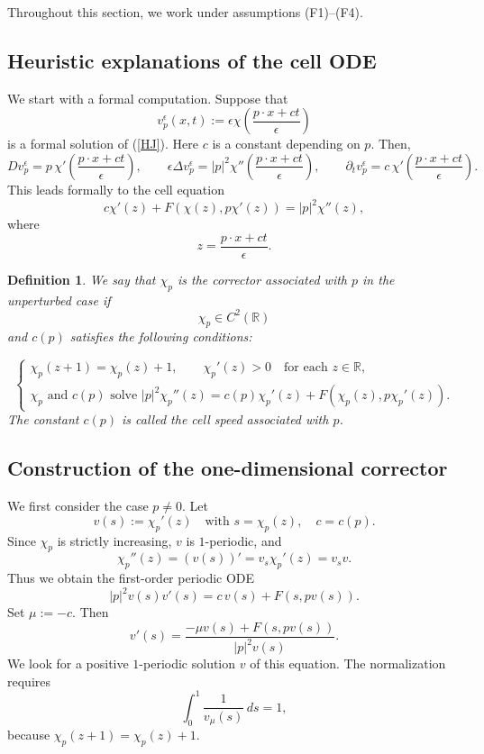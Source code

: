 \documentclass[preprint]{elsarticle}
\newtheorem{definition}{Definition}[section]
\numberwithin{equation}{section}
\begin{document}
Throughout this section, we work under assumptions \textup{(F1)--(F4)}.

\subsection{Heuristic explanations of the cell ODE}

We start with a formal computation. Suppose that
\begin{equation*}
v_p^\epsilon(x,t):=\epsilon \chi\left(\frac{p\cdot x+ct}{\epsilon}\right)
\end{equation*}
is a formal solution of (\ref{HJ}). Here $c$ is a constant depending on $p$. Then,
$$
Dv_p^\epsilon
=
p\,\chi'\left(\frac{p\cdot x+ct}{\epsilon}\right),
\qquad
\epsilon\Delta v_p^\epsilon
=
|p|^2\chi''\left(\frac{p\cdot x+ct}{\epsilon}\right),
\qquad
\partial_t v_p^\epsilon
=
c\,\chi'\left(\frac{p\cdot x+ct}{\epsilon}\right).
$$
This leads formally to the cell equation
\begin{equation*}
c\chi'(z)+F(\chi(z),p\chi'(z))=|p|^2\chi''(z),
\end{equation*}
where
$$
z=\frac{p\cdot x+ct}{\epsilon}.
$$

\medskip
\begin{definition}
 We say that $\chi_p$ is the corrector associated with $p$ in the unperturbed case if
$$
\chi_p\in C^2(\mathbb R)
$$
and $c(p)$ satisfies the following conditions:

\[
\begin{cases}
\chi_p(z+1)=\chi_p(z)+1,\qquad \chi_p'(z)>0
\quad\text{for each }z\in\mathbb R,\\[2mm]
\chi_p \text{ and } c(p) \text{ solve }

|p|^2\chi_p''(z)
=
c(p)\chi_p'(z)+F(\chi_p(z),p\chi_p'(z)).

\end{cases}
\]
The constant $c(p)$ is called the cell speed associated with $p$.
\end{definition}

\subsection{Construction of the one-dimensional corrector}

We first consider the case $p\ne0$. Let
$$
v(s):=\chi_p'(z)
\quad\text{with }s=\chi_p(z),
\quad
c=c(p).
$$
Since $\chi_p$ is strictly increasing, $v$ is $1$-periodic, and
$$
\chi_p''(z)
=
(v(s))'
=
v_s\chi_p'(z)
=
v_s v.
$$
Thus we obtain the first-order periodic ODE
\begin{equation*}
|p|^2v(s)v'(s)=c\,v(s)+F(s,pv(s)).
\end{equation*}
Set $\mu:=-c$. Then
\begin{equation*}
v'(s)=\frac{-\mu v(s)+F(s,pv(s))}{|p|^2v(s)}.
\end{equation*}
We look for a positive $1$-periodic solution $v$ of this equation. The normalization requires
\begin{equation*}
\int_0^1\frac{1}{v_\mu(s)}\,ds=1,
\end{equation*}
because $\chi_p(z+1)=\chi_p(z)+1$.
\end{document}
